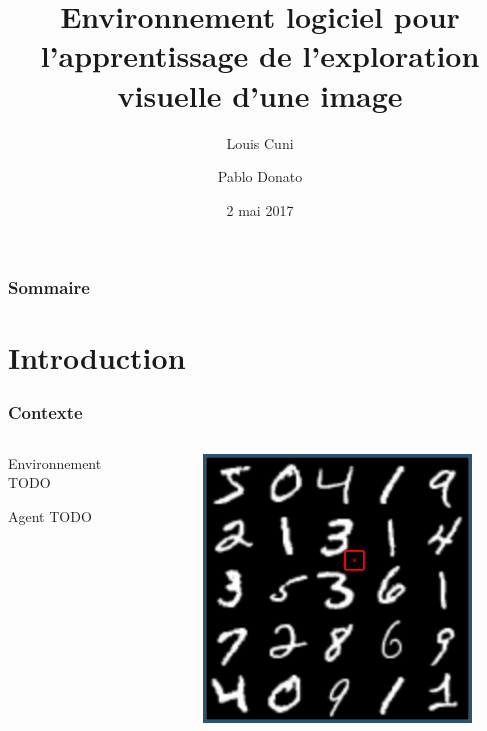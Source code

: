 \documentclass{beamer}
\title[Environnement pour l'exploration visuelle]{Environnement logiciel pour l'apprentissage de l'exploration visuelle d'une image}
\author{Louis Cuni \and Pablo Donato}
\institute[]{Université Pierre et Marie Curie -- Paris VI}
\date{2 mai 2017}
\begin{document}
\frame{\titlepage}

\begin{frame}
    \frametitle{Sommaire}
    \tableofcontents
\end{frame}

\section{Introduction}

\begin{frame}
    \frametitle{Contexte}
    \begin{columns}[T]
        \begin{column}{.48\textwidth}
            \center
            \begin{block}{Environnement}
                TODO
            \end{block}
            \begin{block}{Agent}
                TODO
            \end{block}
        \end{column}
        \begin{column}{.48\textwidth}
            \begin{figure}
                \includegraphics[height=0.5\textheight]{numgrid.png}
            \end{figure}
        \end{column}
    \end{columns}
\end{frame}
\end{document}
